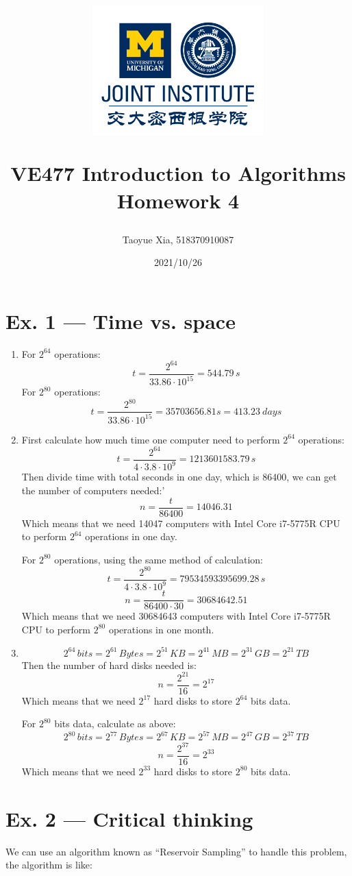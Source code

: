 \documentclass[12pt, a4paper]{article}
\title{
    \begin{figure}[H]
        \centering
        \includegraphics[width=7cm, height=5cm]{AAA.png}
    \end{figure}
    VE477 Introduction to Algorithms\\ 
    Homework 4}
\author{Taoyue Xia, 518370910087}
\date{2021/10/26}
\begin{document}
\maketitle

\newpage

\section*{Ex. 1 --- Time vs. space}
\begin{enumerate}
    \item For $2^{64}$ operations:
          $$t = \frac{2^{64}}{33.86\cdot 10^{15}} = 544.79\, s$$
          For $2^{80}$ operations:
          $$t = \frac{2^{80}}{33.86\cdot 10^{15}} = 35703656.81s = 413.23\ days$$
    \item First calculate how much time one computer need to perform $2^{64}$ operations:
          $$t = \frac{2^{64}}{4\cdot 3.8\cdot 10^9} = 1213601583.79\, s$$
          Then divide time with total seconds in one day, which is 86400, we can get the number of computers needed:'
          $$n = \frac{t}{86400} = 14046.31$$
          Which means that we need 14047 computers with Intel Core i7-5775R CPU to perform $2^{64}$ operations in one day.

          For $2^{80}$ operations, using the same method of calculation:
          $$t = \frac{2^{80}}{4\cdot 3.8\cdot 10^9} = 79534593395699.28\, s$$
          $$n = \frac{t}{86400\cdot 30} = 30684642.51$$
          Which means that we need 30684643 computers with Intel Core i7-5775R CPU to perform $2^{80}$ operations in one month.
    \item $$2^{64}\, bits = 2^{61}\, Bytes = 2^{51}\, KB = 2^{41}\, MB = 2^{31}\, GB = 2^{21}\, TB$$
          Then the number of hard disks needed is:
          $$n = \frac{2^{21}}{16} = 2^{17}$$
          Which means that we need $2^{17}$ hard disks to store $2^{64}$ bits data.

          For $2^{80}$ bits data, calculate as above:
          $$2^{80}\, bits = 2^{77}\, Bytes = 2^{67}\, KB = 2^{57}\, MB = 2^{47}\, GB = 2^{37}\, TB$$
          $$n = \frac{2^{37}}{16} = 2^{33}$$
          Which means that we need $2^{33}$ hard disks to store $2^{80}$ bits data.
\end{enumerate}

\section*{Ex. 2 --- Critical thinking}
We can use an algorithm known as ``Reservoir Sampling'' to handle this problem, the algorithm is like:
\end{document}
